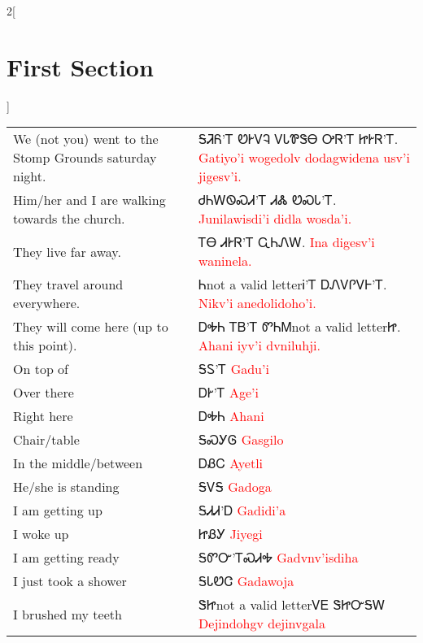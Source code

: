 \begin{multicols}{2}[\section{First Section}]
\begin{minipage}{\linewidth}
\begin{tabular}{p{3cm} p{11cm}}
We (not you) went to the Stomp Grounds saturday night. & ᎦᏘᏲ’Ꭲ ᏬᎨᏙᎸ ᏙᏓᏈᏕᎾ ᎤᏒ’Ꭲ ᏥᎨᏒ’Ꭲ. 
 \newline \textcolor{red}{Gatiyo’i wogedolv dodagwidena usv’i jigesv’i.}\\
Him/her and I are walking towards the church. & ᏧᏂᎳᏫᏍᏗ’Ꭲ ᏗᏜ ᏬᏍᏓ’Ꭲ. 
 \newline \textcolor{red}{Junilawisdi’i didla wosda’i.}\\
They live far away. & ᎢᎾ ᏗᎨᏒ’Ꭲ ᏩᏂᏁᎳ. 
 \newline \textcolor{red}{Ina digesv’i waninela.}\\
They travel around everywhere. & Ꮒnot a valid letterᎥ’Ꭲ ᎠᏁᏙᎵᏙᎰ’Ꭲ. 
 \newline \textcolor{red}{Nikv’i anedolidoho’i.}\\
They will come here (up to this point). & ᎠᎭᏂ ᎢᏴ’Ꭲ ᏛᏂᎷnot a valid letterᏥ. 
 \newline \textcolor{red}{Ahani iyv’i dvniluhji.}\\
On top of & ᎦᏚ’Ꭲ 
 \newline \textcolor{red}{Gadu’i}\\
Over there & ᎠᎨ’Ꭲ 
 \newline \textcolor{red}{Age’i}\\
Right here & ᎠᎭᏂ 
 \newline \textcolor{red}{Ahani}\\
Chair/table & ᎦᏍᎩᎶ 
 \newline \textcolor{red}{Gasgilo}\\
In the middle/between & ᎠᏰᏟ 
 \newline \textcolor{red}{Ayetli}\\
He/she is standing & ᎦᏙᎦ 
 \newline \textcolor{red}{Gadoga}\\
I am getting up & ᎦᏗᏗ’Ꭰ 
 \newline \textcolor{red}{Gadidi’a}\\
I woke up & ᏥᏰᎩ 
 \newline \textcolor{red}{Jiyegi}\\
I am getting ready & ᎦᏛᏅ’ᎢᏍᏗᎭ 
 \newline \textcolor{red}{Gadvnv’isdiha}\\
I just took a shower & ᎦᏓᏬᏣ 
 \newline \textcolor{red}{Gadawoja}\\
I brushed my teeth & ᏕᏥnot a valid letterᏙᎬ ᏕᏥᏅᎦᎳ 
 \newline \textcolor{red}{Dejindohgv dejinvgala}\\

\end{tabular}
\end{minipage}
\end{multicols}
